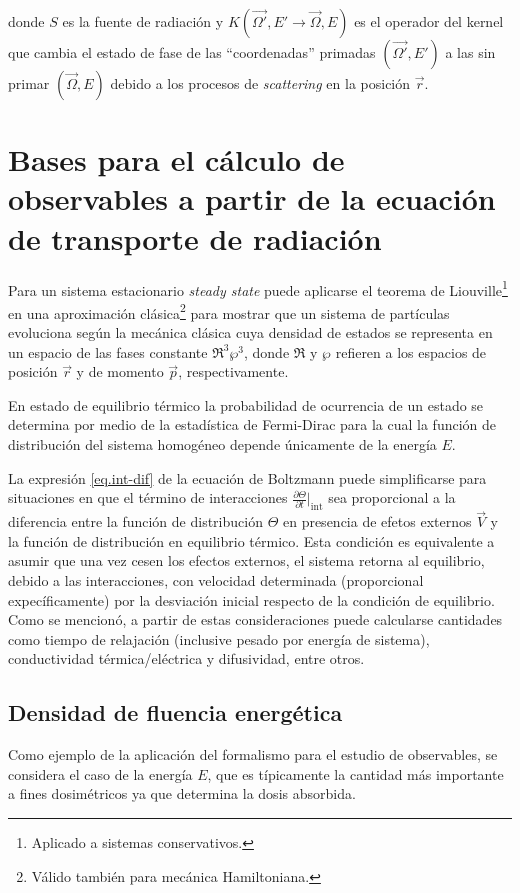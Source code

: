 \noindent
donde $S$ es la fuente de radiación y $K(\vec{\Omega'}, E' \rightarrow \vec{\Omega}, E)$ es el operador del kernel que cambia el estado de fase de las ``coordenadas'' primadas $(\vec{\Omega'}, E')$ a las sin primar $(\vec{\Omega}, E)$ debido a los procesos de \emph{scattering} en la posición $\vec{r}$.
 

\section{Bases para el cálculo de observables a partir de la ecuaci\'on de transporte de radiaci\'on}

Para un sistema estacionario \emph{steady state} puede aplicarse el teorema de Liouville\footnote{Aplicado a sistemas conservativos.} en una aproximación clásica\footnote{Válido también para mecánica Hamiltoniana.} para mostrar que un sistema de partículas evoluciona según la mecánica clásica cuya densidad de estados se representa en un espacio de las fases constante $\Re^{3}\wp^{3}$, donde $\Re$ y $\wp$ refieren a los espacios de posición $\vec{r}$ y de momento $\vec{p}$, respectivamente.

En estado de equilibrio térmico la probabilidad de ocurrencia de un estado se determina por medio de la estadística de Fermi-Dirac para la cual la función de distribución del sistema homogéneo depende únicamente de la energía $E$.

La expresión \ref{eq.int-dif} de la ecuación de Boltzmann puede simplificarse para situaciones en que el término de interacciones $\frac{\partial \Theta}{\partial t}|_\textrm{int}$ sea proporcional a la diferencia entre la función de distribución $\Theta$ en presencia de efetos externos $\vec{V}$ y la función de distribución en equilibrio térmico. Esta condición es equivalente a asumir que una vez cesen los efectos externos, el sistema retorna al equilibrio, debido a las interacciones, con velocidad determinada (proporcional expecíficamente) por la desviación inicial respecto de la condición de equilibrio. Como se mencionó, a partir de estas consideraciones puede calcularse cantidades como tiempo de relajación (inclusive pesado por energía de sistema), conductividad térmica/eléctrica y difusividad, entre otros.


\subsection{Densidad de fluencia energ\'etica}

Como ejemplo de la aplicación del formalismo para el estudio de observables, se considera el caso de la energía $E$, que es típicamente la cantidad más importante a fines dosimétricos ya que determina la dosis absorbida.

